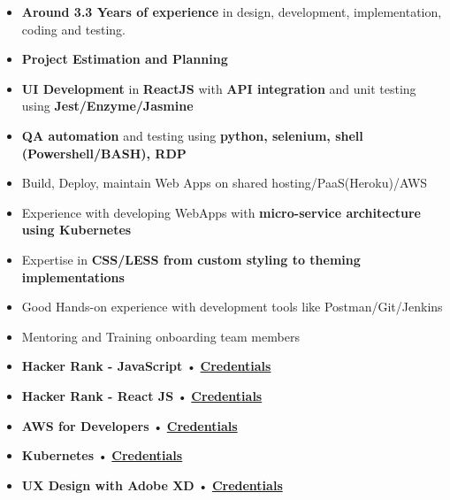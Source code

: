 \begin{itemize}
\item \textbf{Around 3.3 Years of experience} in design, development, implementation, coding and testing.
\item \textbf{Project Estimation and Planning}
\item \textbf{UI Development} in \textbf{ReactJS} with \textbf{API integration} and unit testing using \textbf{Jest/Enzyme/Jasmine}
\item \textbf{QA automation} and testing using \textbf{python, selenium, shell (Powershell/BASH), RDP}
\item Build, Deploy, maintain Web Apps on shared hosting/PaaS(Heroku)/AWS
\item Experience with developing WebApps with \textbf{micro-service architecture using Kubernetes}
\item Expertise in \textbf{CSS/LESS from custom styling to theming implementations}
\item Good Hands-on experience with development tools like Postman/Git/Jenkins
\item Mentoring and Training onboarding team members
\end{itemize}

\smallskip
\begin{itemize}
\item \textbf{Hacker Rank - JavaScript} { • } \href{https://www.hackerrank.com/certificates/9e1b72fa37a2}{\textbf{Credentials}}
\newline
\smallskip

\item \textbf{Hacker Rank - React JS} { • } \href{https://www.hackerrank.com/certificates/6f620b44da51}{\textbf{Credentials}}
\newline
\smallskip

\item \textbf{AWS for Developers} { • } \href{https://www.dropbox.com/s/8a2mixx1nuaw0z9/CertificateOfCompletion_Learning%20Amazon%20Web%20Services%20AWS%20for%20Developers.pdf?dl=0}{\textbf{Credentials}}
\newline
\smallskip

\item \textbf{Kubernetes} { • } \href{https://www.dropbox.com/s/a0usxfusqvmeg82/CertificateOfCompletion_Learning%20Kubernetes.pdf?dl=0}{\textbf{Credentials}}
\newline
\smallskip

\item \textbf{UX Design with Adobe XD} { • } \href{https://www.udemy.com/certificate/UC-8155e0cf-c816-4172-9a82-1516f26752f1/}{\textbf{Credentials}}
\newline
\smallskip
\end{itemize}



